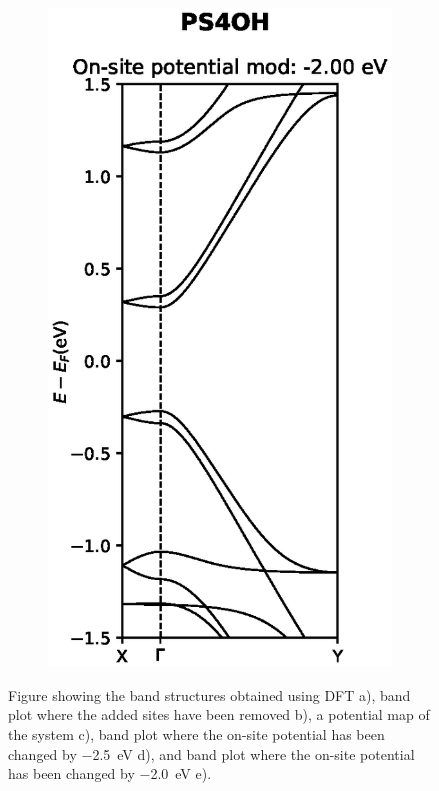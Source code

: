 \begin{figure}[h]
\begin{subfigure}[b]{0.3\textwidth}
    \vspace{-2.5\baselineskip}
    \caption{}
    \label{PS4OHmod1}
    \end{subfigure}
    ~
    \begin{subfigure}[b]{0.3\textwidth}
    \centering
    \includegraphics[width=\textwidth]{Figures/PS4OHmod2.eps}
    \vspace{-2.5\baselineskip}
    \caption{}
    \label{PS4OHdevmod2}
    \end{subfigure}
    \caption{Figure showing the band structures obtained using DFT a), band plot where the added sites have been removed b), a potential map of the system c), band plot where the on-site potential has been changed by \SI{-2.5}{\electronvolt} d), and band plot where the on-site potential has been changed by \SI{-2.0}{\electronvolt} e).}
    \label{PS4OH}
\end{figure}
